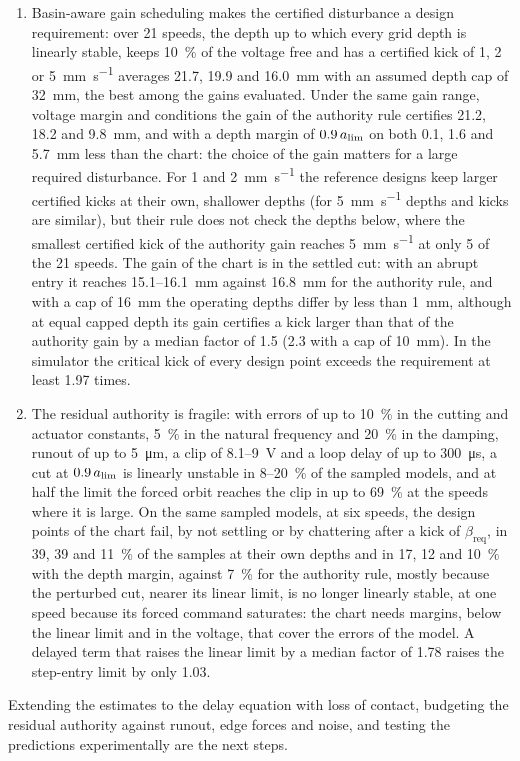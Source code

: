 \begin{enumerate}
\item Basin-aware gain scheduling makes the certified disturbance a design requirement: over 21 speeds, the depth up to which every grid depth is linearly stable, keeps \SI{10}{\percent} of the voltage free and has a certified kick of 1, 2 or \SI{5}{\milli\metre\per\second} averages 21.7, 19.9 and \SI{16.0}{\milli\metre} with an assumed depth cap of \SI{32}{\milli\metre}, the best among the gains evaluated. Under the same gain range, voltage margin and conditions the gain of the authority rule certifies 21.2, 18.2 and \SI{9.8}{\milli\metre}, and with a depth margin of $0.9\,a_{\lim}$ on both 0.1, 1.6 and \SI{5.7}{\milli\metre} less than the chart: the choice of the gain matters for a large required disturbance. For 1 and \SI{2}{\milli\metre\per\second} the reference designs keep larger certified kicks at their own, shallower depths (for \SI{5}{\milli\metre\per\second} depths and kicks are similar), but their rule does not check the depths below, where the smallest certified kick of the authority gain reaches \SI{5}{\milli\metre\per\second} at only 5 of the 21 speeds. The gain of the chart is in the settled cut: with an abrupt entry it reaches 15.1--\SI{16.1}{\milli\metre} against \SI{16.8}{\milli\metre} for the authority rule, and with a cap of \SI{16}{\milli\metre} the operating depths differ by less than \SI{1}{\milli\metre}, although at equal capped depth its gain certifies a kick larger than that of the authority gain by a median factor of 1.5 (2.3 with a cap of \SI{10}{\milli\metre}). In the simulator the critical kick of every design point exceeds the requirement at least 1.97 times.
\item The residual authority is fragile: with errors of up to \SI{10}{\percent} in the cutting and actuator constants, \SI{5}{\percent} in the natural frequency and \SI{20}{\percent} in the damping, runout of up to \SI{5}{\micro\metre}, a clip of 8.1--\SI{9}{\volt} and a loop delay of up to \SI{300}{\micro\second}, a cut at $0.9\,a_{\lim}$ is linearly unstable in 8--\SI{20}{\percent} of the sampled models, and at half the limit the forced orbit reaches the clip in up to \SI{69}{\percent} at the speeds where it is large. On the same sampled models, at six speeds, the design points of the chart fail, by not settling or by chattering after a kick of $\beta_{\mathrm{req}}$, in 39, 39 and \SI{11}{\percent} of the samples at their own depths and in 17, 12 and \SI{10}{\percent} with the depth margin, against \SI{7}{\percent} for the authority rule, mostly because the perturbed cut, nearer its linear limit, is no longer linearly stable, at one speed because its forced command saturates: the chart needs margins, below the linear limit and in the voltage, that cover the errors of the model. A delayed term that raises the linear limit by a median factor of 1.78 raises the step-entry limit by only 1.03.
\end{enumerate}
Extending the estimates to the delay equation with loss of contact, budgeting the residual authority against runout, edge forces and noise, and testing the predictions experimentally are the next steps.
